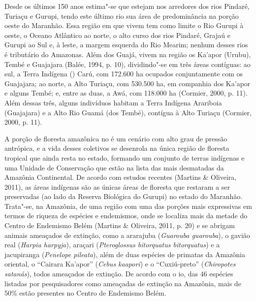 Desde os últimos 150 anos estima"-se que estejam nos arredores dos rios
Pindaré, Turiaçu e Gurupi, tendo este último rio sua área de
predominância na porção oeste do Maranhão. Essa região em que vivem tem
como limite o Rio Gurupi à oeste, o Oceano Atlântico ao norte, o alto
curso dos rios Pindaré, Grajaú e Gurupi ao Sul e, à leste, a margem
esquerda do Rio Mearim; nenhum desses rios é tributário do Amazonas.
Além dos Guajá, vivem na região os Ka'apor (Urubu), Tembé e Guajajara
(Balée, 1994, p. 10), dividindo"-se em três áreas contíguas: ao sul, a
Terra Indígena () Carú, com 172.600 ha ocupados conjuntamente com os
Guajajara; ao norte, a  Alto Turiaçu, com 530.500 ha, em companhia dos
Ka'apor e alguns Tembé; e, entre as duas, a  Awá, com 118.000 ha
(Cormier, 2000, p. 11). Além dessas três, alguns indivíduos habitam a
Terra Indígena Arariboia (Guajajara) e a  Alto Rio Guamá (dos Tembé),
contígua à  Alto Turiaçu (Cormier, 2000, p. 11).

A porção de floresta amazônica no  é um cenário com alto grau de
pressão antrópica, e a vida desses coletivos se desenrola na única
região de floresta tropical que ainda resta no estado, formando um
conjunto de terras indígenas e uma Unidade de Conservação que estão na
lista das mais desmatadas da Amazônia Continental. De acordo com estudos
recentes (Martins \& Oliveira, 2011), as áreas indígenas são as únicas
áreas de floresta que restaram a ser preservadas (ao lado da Reserva
Biológica do Gurupi) no estado do Maranhão. Trata"-se, na Amazônia, de
uma região com uma das porções mais expressivas em termos de riqueza de
espécies e endemismos, onde se localiza mais da metade do Centro de
Endemismo Belém (Martins \& Oliveira, 2011, p. 20) e se abrigam animais
ameaçados de extinção, como a ararajuba (\emph{Guarouba guarouba}), o
gavião real (\emph{Harpia harpyja}), araçari (\emph{Pteroglossus
bitorquatus bitorquatus}) e a jacupiranga (\emph{Penelope pileata}),
além de duas espécies de primatas da Amazônia oriental, o ``Cairara
Ka'apor'' (\emph{Cebus kaapori}) e o ``Cuxiú-preto'' (\emph{Chiropotes
satanás}), todos ameaçados de extinção. De acordo com o io, das 46
espécies listadas por pesquisadores como ameaçadas de extinção na
Amazônia, mais de 50\% estão presentes no Centro de Endemismo Belém.


